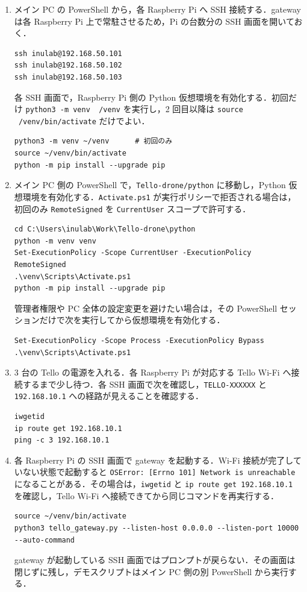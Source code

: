 \begin{enumerate}[label=\arabic*.]
  \item メイン PC の PowerShell から，各 Raspberry Pi へ SSH 接続する．gateway は各 Raspberry Pi 上で常駐させるため，Pi の台数分の SSH 画面を開いておく．
\begin{lstlisting}
ssh inulab@192.168.50.101
ssh inulab@192.168.50.102
ssh inulab@192.168.50.103
\end{lstlisting}
  各 SSH 画面で，Raspberry Pi 側の Python 仮想環境を有効化する．初回だけ \texttt{python3 -m venv ~/venv} を実行し，2 回目以降は \texttt{source ~/venv/bin/activate} だけでよい．
\begin{lstlisting}
python3 -m venv ~/venv      # 初回のみ
source ~/venv/bin/activate
python -m pip install --upgrade pip
\end{lstlisting}

  \item メイン PC 側の PowerShell で，\texttt{Tello-drone/python} に移動し，Python 仮想環境を有効化する．\texttt{Activate.ps1} が実行ポリシーで拒否される場合は，初回のみ \texttt{RemoteSigned} を \texttt{CurrentUser} スコープで許可する．
\begin{lstlisting}
cd C:\Users\inulab\Work\Tello-drone\python
python -m venv venv
Set-ExecutionPolicy -Scope CurrentUser -ExecutionPolicy RemoteSigned
.\venv\Scripts\Activate.ps1
python -m pip install --upgrade pip
\end{lstlisting}
  管理者権限や PC 全体の設定変更を避けたい場合は，その PowerShell セッションだけで次を実行してから仮想環境を有効化する．
\begin{lstlisting}
Set-ExecutionPolicy -Scope Process -ExecutionPolicy Bypass
.\venv\Scripts\Activate.ps1
\end{lstlisting}

  \item 3 台の Tello の電源を入れる．各 Raspberry Pi が対応する Tello Wi-Fi へ接続するまで少し待つ．各 SSH 画面で次を確認し，\texttt{TELLO-XXXXXX} と \texttt{192.168.10.1} への経路が見えることを確認する．
\begin{lstlisting}
iwgetid
ip route get 192.168.10.1
ping -c 3 192.168.10.1
\end{lstlisting}

  \item 各 Raspberry Pi の SSH 画面で gateway を起動する．Wi-Fi 接続が完了していない状態で起動すると \texttt{OSError: [Errno 101] Network is unreachable} になることがある．その場合は，\texttt{iwgetid} と \texttt{ip route get 192.168.10.1} を確認し，Tello Wi-Fi へ接続できてから同じコマンドを再実行する．
\begin{lstlisting}
source ~/venv/bin/activate
python3 tello_gateway.py --listen-host 0.0.0.0 --listen-port 10000 --auto-command
\end{lstlisting}
  gateway が起動している SSH 画面ではプロンプトが戻らない．その画面は閉じずに残し，デモスクリプトはメイン PC 側の別 PowerShell から実行する．


\end{enumerate}
